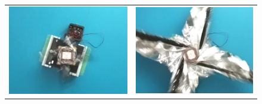 \begin{figure}[H]
	\centering
	\begin{tabular}{cc}
		\begin{minipage}{0.5\hsize}
			\begin{center}
				\includegraphics[width=1\textwidth]{03/fig/3-9-2-3-2.jpg}
			\end{center}
		\end{minipage}&
		\begin{minipage}{0.5\hsize}
			\begin{center}
				\includegraphics[width=1\textwidth]{03/fig/3-9-2-3-3.jpg}
			\end{center}
		\end{minipage}\\

\end{tabular}
\end{figure}
